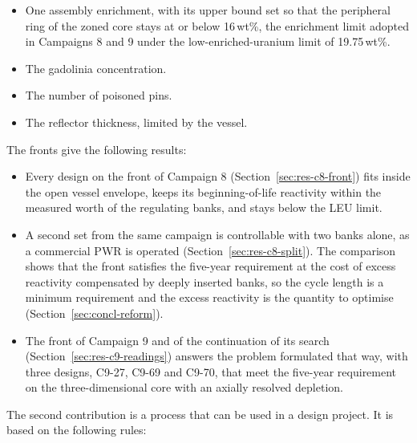 \begin{itemize}
  \item One assembly enrichment, with its upper bound set so that the
        peripheral ring of the zoned core stays at or below 16\,wt\%,
        the enrichment limit adopted in Campaigns 8 and 9 under the
        low-enriched-uranium limit of 19.75\,wt\%.

  \item The gadolinia concentration.

  \item The number of poisoned pins.

  \item The reflector thickness, limited by the vessel.
\end{itemize}

The fronts give the following results:

\begin{itemize}
  \item Every design on the front of Campaign 8
        (Section~\ref{sec:res-c8-front}) fits inside the open vessel
        envelope, keeps its beginning-of-life reactivity within the
        measured worth of the regulating banks, and stays below the LEU
        limit.


  \item A second set from the same campaign is controllable with two
        banks alone, as a commercial PWR is operated
        (Section~\ref{sec:res-c8-split}). The comparison shows that the
        front satisfies the five-year requirement at the cost of excess
        reactivity compensated by deeply inserted banks, so the cycle length is
        a minimum requirement and the excess reactivity is the quantity
        to optimise (Section~\ref{sec:concl-reform}).

    \item The front of Campaign 9 and of the continuation of its search
        (Section~\ref{sec:res-c9-readings}) answers the problem
        formulated that way, with three designs, C9-27, C9-69 and C9-70,
        that meet the five-year requirement on the three-dimensional
        core with an axially resolved depletion.
\end{itemize}

The second contribution is a process that can be used in a design
project. It is based on the following rules:

